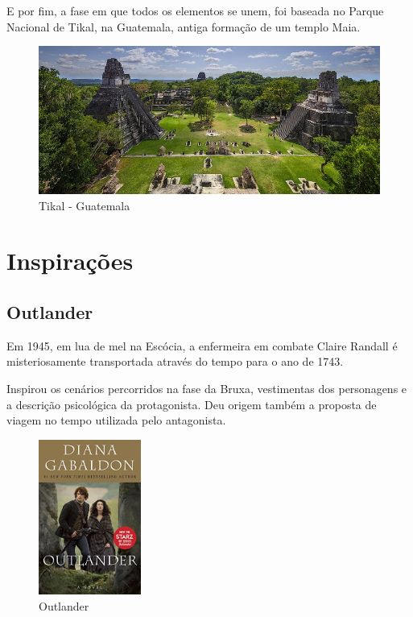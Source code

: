 E por fim, a fase em que todos os elementos se unem, foi baseada no Parque Nacional de Tikal, na Guatemala, antiga formação de um templo Maia.


\begin{figure}[htb]
    \caption{\label{fig_mundoHub}Tikal - Guatemala}
    \begin{center}
        \includegraphics[width=\textwidth]{imagens/tikal.jpg}
    \end{center}
\end{figure}

\clearpage

\section{Inspirações}


\subsection{Outlander}

Em 1945, em lua de mel na Escócia, a enfermeira em combate Claire Randall é misteriosamente transportada através do tempo para o ano de 1743.

Inspirou os cenários percorridos na fase da Bruxa, vestimentas dos personagens e a descrição psicológica da protagonista. Deu origem também a proposta de viagem no tempo utilizada pelo antagonista.

\begin{figure}[!htb] \caption{\label{Outlander}Outlander} \begin{center}
\includegraphics[width=0.3\textwidth]{imagens/outlander.jpg} \end{center}
 \end{figure}

